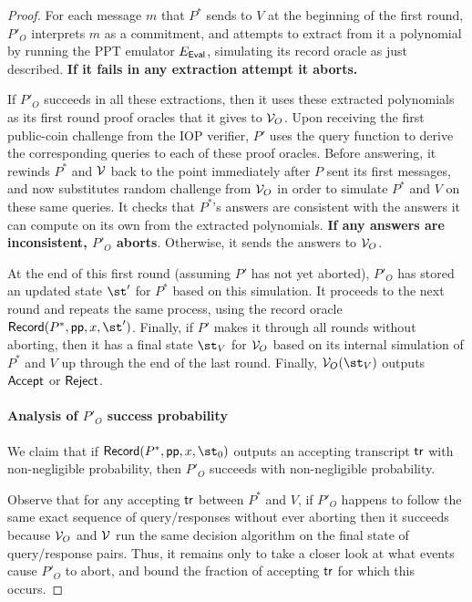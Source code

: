 \begin{proof}
For each message $m$ that $P^*$ sends to $V$ at the beginning of the first round, $P'_O$ interprets $m$ as a commitment, and attempts to extract from it a polynomial by 
running the PPT emulator $E_\textsf{{Eval}}$, simulating its record oracle as just described. \textbf{If it fails in any extraction attempt it aborts.} 

If $P'_O$ succeeds in all these extractions, then it uses these extracted polynomials as its first round proof oracles that it gives to $\mathcal{V}_O$. Upon receiving the first public-coin challenge from the IOP verifier, $P'$ uses the query function to derive the corresponding queries to each of these proof oracles. Before answering, it rewinds $P^*$ and $\mathcal{V}$ back to the point immediately after $P$ sent its first messages, and now substitutes random challenge from $\mathcal{V}_O$ in order to simulate $P^*$ and $V$ on these same queries. It checks that $P^*$'s answers are consistent with the answers it can compute on its own from the extracted polynomials. \textbf{If any answers are inconsistent, $P'_O$ aborts}. Otherwise, it sends the answers to $\mathcal{V}_O$. 

At the end of this first round (assuming $P'$ has not yet aborted), $P'_O$ has stored an updated state $\st'$ for $P^*$ based on this simulation. It proceeds to the next round and repeats the same process, using the record oracle $\pro{Record}(P^*, \params, x, \st')$. Finally, if $P'$ makes it through all rounds without aborting, then it has a final state $\st_V$ for $\mathcal{V}_O$ based on its internal simulation of $P^*$ and $V$ up through the end of the last round. Finally, $\verifier_O(\st_V)$ outputs $\textsf{{Accept}}$ or $\textsf{{Reject}}$. %

\paragraph{Analysis of $P'_O$ success probability} 
We claim that if $\pro{Record}(P^*, \params, x, \st_0)$ outputs an accepting transcript $\textsf{{tr}}$ with non-negligible probability, then $P'_O$ succeeds with non-negligible probability. 

Observe that for any accepting $\textsf{{tr}}$ between $P^*$ and $V$, if $P'_O$ happens to follow the same exact sequence of query/responses without ever aborting then it succeeds because $\mathcal{V}_O$ and $\mathcal{V}$ run the same decision algorithm on the final state of query/response pairs. Thus, it remains only to take a closer look at what events cause $P'_O$ to abort, and bound the fraction of accepting $\textsf{{tr}}$ for which this occurs. 


\end{proof}
